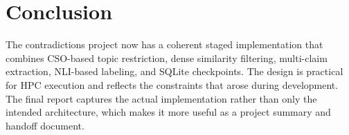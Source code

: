 \documentclass[11pt]{article}
\begin{document}
\section{Conclusion}
The contradictions project now has a coherent staged implementation that combines CSO-based topic restriction, dense similarity filtering, multi-claim extraction, NLI-based labeling, and SQLite checkpoints. The design is practical for HPC execution and reflects the constraints that arose during development. The final report captures the actual implementation rather than only the intended architecture, which makes it more useful as a project summary and handoff document.
\end{document}
